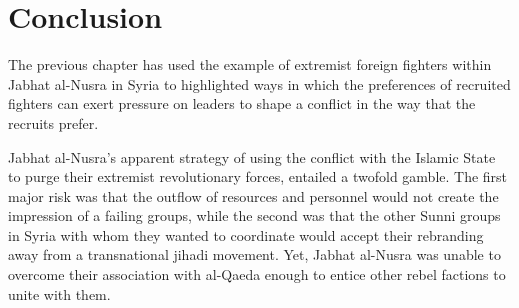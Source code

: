 \section{Conclusion}

The previous chapter has used the example of extremist foreign fighters within Jabhat al-Nusra in Syria to highlighted ways in which the preferences of recruited fighters can exert pressure on leaders to shape a conflict in the way that the recruits prefer.
 
Jabhat al-Nusra’s apparent strategy of using the conflict with the Islamic State to purge their extremist revolutionary forces, entailed a twofold gamble. The first major risk was that the outflow of resources and personnel would not create the impression of a failing groups, while the second was that the other Sunni groups in Syria with whom they wanted to coordinate would accept their rebranding away from a transnational jihadi movement. Yet, Jabhat al-Nusra was unable to overcome their association with al-Qaeda enough to entice other rebel factions to unite with them. 



